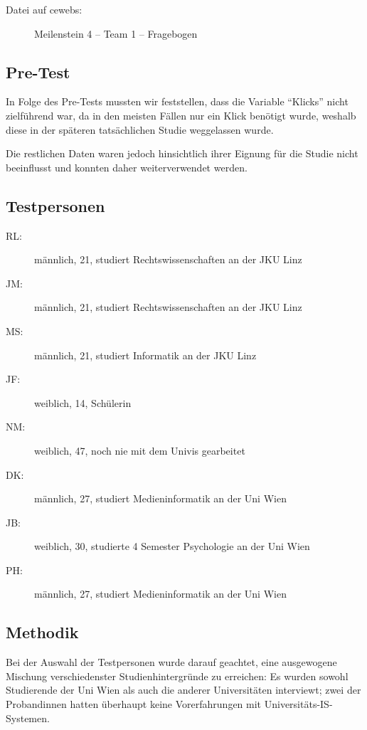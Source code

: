 \documentclass[a4paper,10pt]{scrartcl}
\begin{document}
\begin{description}
 \item[Datei auf cewebs:] Meilenstein 4 -- Team 1 -- Fragebogen
\end{description}

\subsection{Pre-Test}

In Folge des Pre-Tests mussten wir feststellen, dass die Variable ``Klicks'' nicht zielführend war,
da in den meisten Fällen nur ein Klick benötigt wurde, weshalb diese in der späteren tatsächlichen Studie weggelassen wurde.

Die restlichen Daten waren jedoch hinsichtlich ihrer Eignung für die Studie nicht beeinflusst und konnten daher weiterverwendet werden.

\subsection{Testpersonen}

\begin{description}
 \item[RL:] männlich, 21, studiert Rechtswissenschaften an der JKU Linz
 \item[JM:] männlich, 21, studiert Rechtswissenschaften an der JKU Linz
 \item[MS:] männlich, 21, studiert Informatik an der JKU Linz
 \item[JF:] weiblich, 14, Schülerin
 \item[NM:] weiblich, 47, noch nie mit dem Univis gearbeitet
 \item[DK:] männlich, 27, studiert Medieninformatik an der Uni Wien
 \item[JB:] weiblich, 30, studierte 4 Semester Psychologie an der Uni Wien
 \item[PH:] männlich, 27, studiert Medieninformatik an der Uni Wien
\end{description}

\subsection{Methodik}

Bei der Auswahl der Testpersonen wurde darauf geachtet, eine ausgewogene Mischung verschiedenster Studienhintergründe zu erreichen: Es wurden sowohl Studierende der Uni Wien als auch die anderer Universitäten interviewt; zwei der Probandinnen hatten überhaupt keine Vorerfahrungen mit Universitäts-IS-Systemen.
\end{document}
